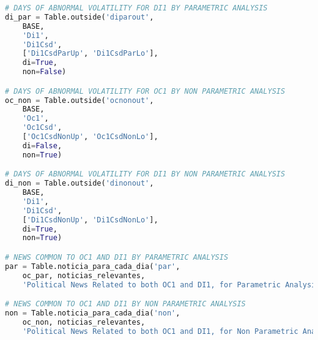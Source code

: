 \begin{lstlisting}[language=Python]
# DAYS OF ABNORMAL VOLATILITY FOR DI1 BY PARAMETRIC ANALYSIS
di_par = Table.outside('diparout',
    BASE,
    'Di1',
    'Di1Csd',
    ['Di1CsdParUp', 'Di1CsdParLo'],
    di=True,
    non=False)

# DAYS OF ABNORMAL VOLATILITY FOR OC1 BY NON PARAMETRIC ANALYSIS
oc_non = Table.outside('ocnonout',
    BASE,
    'Oc1',
    'Oc1Csd',
    ['Oc1CsdNonUp', 'Oc1CsdNonLo'],
    di=False,
    non=True)

# DAYS OF ABNORMAL VOLATILITY FOR DI1 BY NON PARAMETRIC ANALYSIS
di_non = Table.outside('dinonout',
    BASE,
    'Di1',
    'Di1Csd',
    ['Di1CsdNonUp', 'Di1CsdNonLo'],
    di=True,
    non=True)

# NEWS COMMON TO OC1 AND DI1 BY PARAMETRIC ANALYSIS
par = Table.noticia_para_cada_dia('par',
    oc_par, noticias_relevantes,
    'Political News Related to both OC1 and DI1, for Parametric Analysis')

# NEWS COMMON TO OC1 AND DI1 BY NON PARAMETRIC ANALYSIS
non = Table.noticia_para_cada_dia('non',
    oc_non, noticias_relevantes,
    'Political News Related to both OC1 and DI1, for Non Parametric Analysis')

\end{lstlisting}